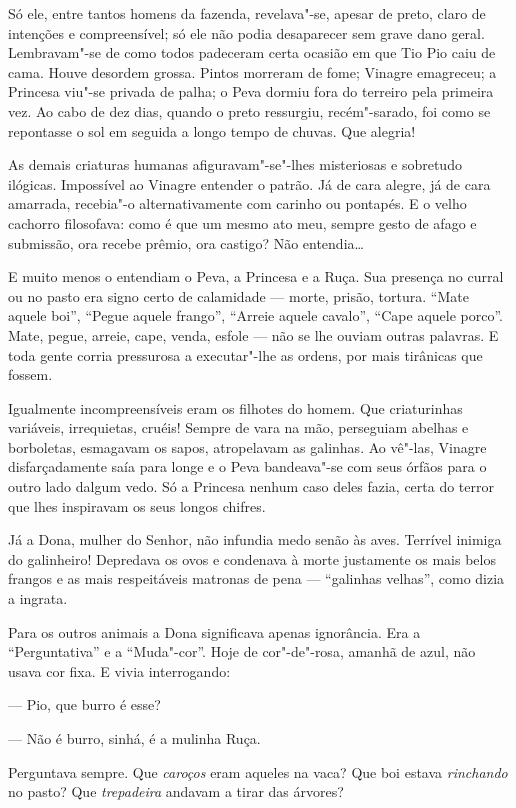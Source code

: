 Só ele, entre tantos homens da fazenda, revelava"-se, apesar de preto,
claro de intenções e compreensível; só ele não podia desaparecer sem
grave dano geral. Lembravam"-se de como todos padeceram certa ocasião em
que Tio Pio caiu de cama. Houve desordem grossa. Pintos morreram de
fome; Vinagre emagreceu; a Princesa viu"-se privada de palha; o Peva
dormiu fora do terreiro pela primeira vez. Ao cabo de dez dias, quando o
preto ressurgiu, recém"-sarado, foi como se repontasse o sol em seguida a
longo tempo de chuvas. Que alegria!

As demais criaturas humanas afiguravam"-se"-lhes misteriosas e sobretudo
ilógicas. Impossível ao Vinagre entender o patrão. Já de cara alegre, já
de cara amarrada, recebia"-o alternativamente com carinho ou pontapés. E
o velho cachorro filosofava: como é que um mesmo ato meu, sempre gesto
de afago e submissão, ora recebe prêmio, ora castigo? Não entendia\ldots{}

E muito menos o entendiam o Peva, a Princesa e a Ruça. Sua presença no
curral ou no pasto era signo certo de calamidade --- morte, prisão,
tortura. ``Mate aquele boi'', ``Pegue aquele frango'', ``Arreie aquele
cavalo'', ``Cape aquele porco''. Mate, pegue, arreie, cape, venda,
esfole --- não se lhe ouviam outras palavras. E toda gente corria
pressurosa a executar"-lhe as ordens, por mais tirânicas que fossem.

Igualmente incompreensíveis eram os filhotes do homem. Que criaturinhas
variáveis, irrequietas, cruéis! Sempre de vara na mão, perseguiam
abelhas e borboletas, esmagavam os sapos, atropelavam as galinhas. Ao
vê"-las, Vinagre disfarçadamente saía para longe e o Peva bandeava"-se com
seus órfãos para o outro lado dalgum vedo. Só a Princesa nenhum caso
deles fazia, certa do terror que lhes inspiravam os seus longos chifres.

Já a Dona, mulher do Senhor, não infundia medo senão às aves. Terrível
inimiga do galinheiro! Depredava os ovos e condenava à morte justamente
os mais belos frangos e as mais respeitáveis matronas de pena ---
``galinhas velhas'', como dizia a ingrata.

Para os outros animais a Dona significava apenas ignorância. Era a
``Perguntativa'' e a ``Muda"-cor''. Hoje de cor"-de"-rosa, amanhã de azul,
não usava cor fixa. E vivia interrogando:

--- Pio, que burro é esse?

--- Não é burro, sinhá, é a mulinha Ruça.

Perguntava sempre. Que \emph{caroços} eram aqueles na vaca? Que boi
estava \emph{rinchando} no pasto? Que \emph{trepadeira} andavam a tirar
das árvores?

